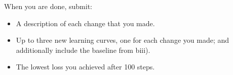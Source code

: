 \begin{parts}
    When you are done, submit:

    \begin{itemize}
        \item A description of each change that you made.
        \item Up to three new learning curves, one for each change you made; and additionally include the baseline from biii).
        \item The lowest loss you achieved after 100 steps.
    \end{itemize}

    
\end{parts}







